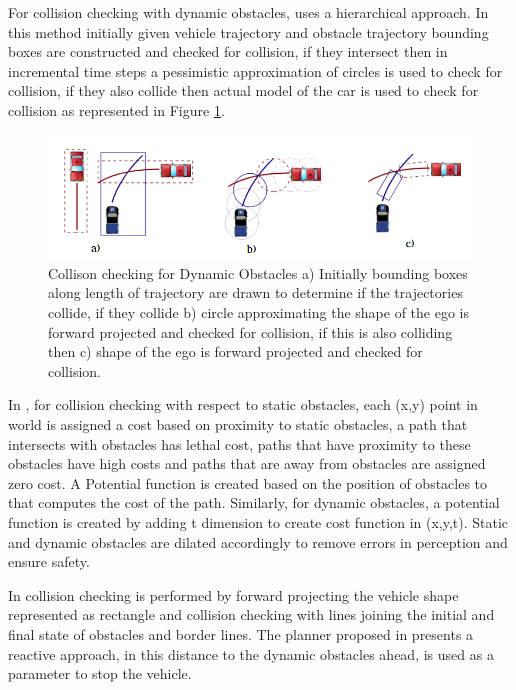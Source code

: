 For collision checking with dynamic obstacles, \cite{kolski_thesis} uses a hierarchical approach. In this method initially given vehicle trajectory and obstacle trajectory bounding boxes are constructed and checked for collision, if they intersect then in incremental time steps a pessimistic approximation of circles is used to check for collision, if they also collide then actual model of the car is used to check for collision as represented in Figure \ref{kolskidynamicobst}.

\begin{figure}
	\centering
	\includegraphics[width=1.0\textwidth]{Images/related_work/kolskidynamicobstacles.png}
	\caption{Collison checking for Dynamic Obstacles \cite{kolski_thesis} a) Initially bounding boxes along length of trajectory are drawn to determine if the trajectories collide, if they collide b) circle approximating the shape of the ego is forward projected and checked for collision, if this is also colliding then c) shape of the ego is forward projected and checked for collision.}
	\label{kolskidynamicobst}
\end{figure} 

In \cite{cmu_parallel_thesis}, for collision checking with respect to static obstacles, each (x,y) point in world is assigned a cost based on proximity to static obstacles, a path that intersects with obstacles has lethal cost, paths that have proximity to these obstacles have high costs and paths that are away from obstacles are assigned zero cost. A Potential function is created based on the position of obstacles to that computes the cost of the path. Similarly, for dynamic obstacles, a potential function is created by adding t dimension to create cost function in (x,y,t). Static and dynamic obstacles are dilated accordingly to remove errors in perception and ensure safety.


In \cite{rrt_star} collision checking is performed by forward projecting the vehicle shape represented as rectangle and collision checking with lines joining the initial and final state of obstacles and border lines. The planner proposed in \cite{volvo_reactive_traj} presents a reactive approach, in this distance to the dynamic obstacles ahead, is used as a parameter to stop the vehicle.


